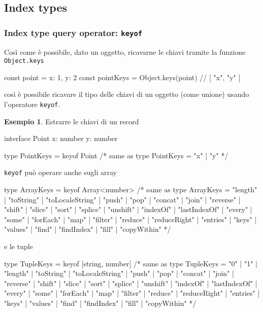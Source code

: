 \documentclass[12pt]{article}
\theoremstyle{definition}
\newtheorem{example}{Esempio}[subsection]
\newenvironment{code}
  {\vspace{0.5cm} \VerbatimEnvironment\begin{typescriptcode}}
  {\end{typescriptcode} \vspace{0.2cm}}
\begin{document}
\subsection{Index types}

\subsubsection{Index type query operator: \texttt{keyof}}

Così come è possibile, dato un oggetto, ricavarne le chiavi tramite la funzione \texttt{Object.keys}

\begin{code}
const point = { x: 1, y: 2 }
const pointKeys = Object.keys(point)
// [ "x", "y" ]
\end{code}

così è possibile ricavare il tipo delle chiavi di un oggetto (come unione) usando l'operatore \texttt{keyof}.

\begin{example}
Estrarre le chiavi di un record

\begin{code}
interface Point {
  x: number
  y: number
}

type PointKeys = keyof Point
/* same as
type PointKeys = "x" | "y"
*/
\end{code}

\texttt{keyof} può operare anche sugli array

\begin{code}
type ArrayKeys = keyof Array<number>
/* same as
type ArrayKeys = "length" | "toString" | "toLocaleString" |
"push" | "pop" | "concat" | "join" | "reverse" | "shift" |
"slice" | "sort" | "splice" | "unshift" | "indexOf" |
"lastIndexOf" | "every" | "some" | "forEach" | "map" |
"filter" | "reduce" | "reduceRight" | "entries" | "keys"
| "values" | "find" | "findIndex" | "fill" | "copyWithin"
*/
\end{code}

e le tuple

\begin{code}
type TupleKeys = keyof [string, number]
/* same as
type TupleKeys = "0" | "1" | "length" | "toString" |
"toLocaleString" | "push" | "pop" | "concat" | "join" |
"reverse" | "shift" | "slice" | "sort" | "splice" |
"unshift" | "indexOf" | "lastIndexOf" | "every" |
"some" | "forEach" | "map" | "filter" | "reduce" |
"reduceRight" | "entries" | "keys" | "values" |
"find" | "findIndex" | "fill" | "copyWithin"
*/
\end{code}
\end{example}
\end{document}
